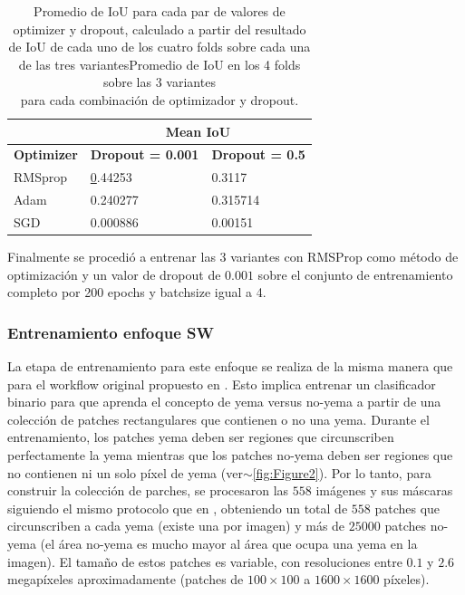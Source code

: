 \documentclass[a4paper,authoryear,review]{elsarticle}
\begin{document}
	
	\begin{table}[]
		\centering
		\begin{tabular}{lll}
			\hline
			\multicolumn{1}{|l|}{} & \multicolumn{2}{c|}{\textbf{Mean IoU}} \\ \hline
			\multicolumn{1}{|c|}{\textbf{Optimizer}} & \multicolumn{1}{c|}{\textbf{Dropout = 0.001}} & \multicolumn{1}{c|}{\textbf{Dropout = 0.5}} \\ \hline
			RMSprop & {\ul 0.44253} & 0.3117 \\
			Adam & 0.240277 & 0.315714 \\
			SGD & 0.000886 & 0.00151 \\ \hline
		\end{tabular}%
		\caption{Promedio de IoU para cada par de valores de optimizer y dropout, calculado a partir del resultado de IoU de cada uno de los cuatro folds sobre cada una de las tres variantesPromedio de IoU en los 4 folds sobre las $3$ variantes \\
			para cada combinación de optimizador y dropout.}
		\label{tab:TablaX}
	\end{table}
	
	
	Finalmente se procedió a entrenar las 3 variantes con RMSProp como método de optimización y un valor de dropout de $0.001$ sobre el conjunto de entrenamiento completo por 200 epochs y batchsize igual a 4.
	
	\subsubsection{Entrenamiento enfoque SW} 
	\label{sec:swtrain}
	
	
	La etapa de entrenamiento para este enfoque se realiza de la misma manera que para el workflow original propuesto en \citet{perez2017image}. Esto implica entrenar un clasificador binario para que aprenda el concepto de yema versus no-yema a partir de una colección de patches rectangulares que contienen o no una yema. Durante el entrenamiento, los patches yema deben ser regiones que circunscriben perfectamente la yema mientras que los  patches no-yema deben ser regiones que no contienen ni un solo píxel de yema (ver$\sim$\ref{fig:Figure2}). Por lo tanto, para construir la colección de parches, se procesaron las $558$ imágenes y sus máscaras siguiendo el mismo protocolo que en \citet{perez2017image}, obteniendo un total de $558$ patches que circunscriben a cada yema (existe una por imagen) y más de $25000$ patches no-yema (el área no-yema es mucho mayor al área que ocupa una yema en la imagen). El tamaño de estos patches es variable, con resoluciones entre $0.1$ y $2.6$ megapíxeles aproximadamente (patches de $100 \times 100$ a $1600 \times 1600$ píxeles).
	
\end{document}
